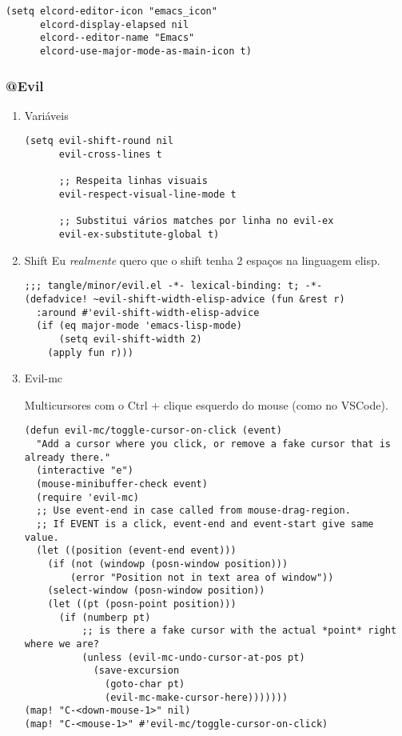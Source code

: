 \documentclass[11pt]{article}
\begin{document}
\begin{verbatim}
(setq elcord-editor-icon "emacs_icon"
      elcord-display-elapsed nil
      elcord--editor-name "Emacs"
      elcord-use-major-mode-as-main-icon t)
\end{verbatim}

\subsubsection{@Evil}
\label{sec:orgcd1996c}
\begin{enumerate}
\item Variáveis
\label{sec:orgcbb7603}
\begin{verbatim}
(setq evil-shift-round nil
      evil-cross-lines t

      ;; Respeita linhas visuais
      evil-respect-visual-line-mode t

      ;; Substitui vários matches por linha no evil-ex
      evil-ex-substitute-global t)
\end{verbatim}

\item Shift
\label{sec:org94e564b}
Eu \emph{realmente} quero que o shift tenha 2 espaços na linguagem elisp.
\begin{verbatim}
;;; tangle/minor/evil.el -*- lexical-binding: t; -*-
(defadvice! ~evil-shift-width-elisp-advice (fun &rest r)
  :around #'evil-shift-width-elisp-advice
  (if (eq major-mode 'emacs-lisp-mode)
      (setq evil-shift-width 2)
    (apply fun r)))
\end{verbatim}

\item Evil-mc
\label{sec:orgde0588d}

Multicursores com o Ctrl + clique esquerdo do mouse (como no VSCode).
\begin{verbatim}
(defun evil-mc/toggle-cursor-on-click (event)
  "Add a cursor where you click, or remove a fake cursor that is
already there."
  (interactive "e")
  (mouse-minibuffer-check event)
  (require 'evil-mc)
  ;; Use event-end in case called from mouse-drag-region.
  ;; If EVENT is a click, event-end and event-start give same value.
  (let ((position (event-end event)))
    (if (not (windowp (posn-window position)))
        (error "Position not in text area of window"))
    (select-window (posn-window position))
    (let ((pt (posn-point position)))
      (if (numberp pt)
          ;; is there a fake cursor with the actual *point* right where we are?
          (unless (evil-mc-undo-cursor-at-pos pt)
            (save-excursion
              (goto-char pt)
              (evil-mc-make-cursor-here)))))))
(map! "C-<down-mouse-1>" nil)
(map! "C-<mouse-1>" #'evil-mc/toggle-cursor-on-click)
\end{verbatim}
\end{enumerate}
\end{document}
